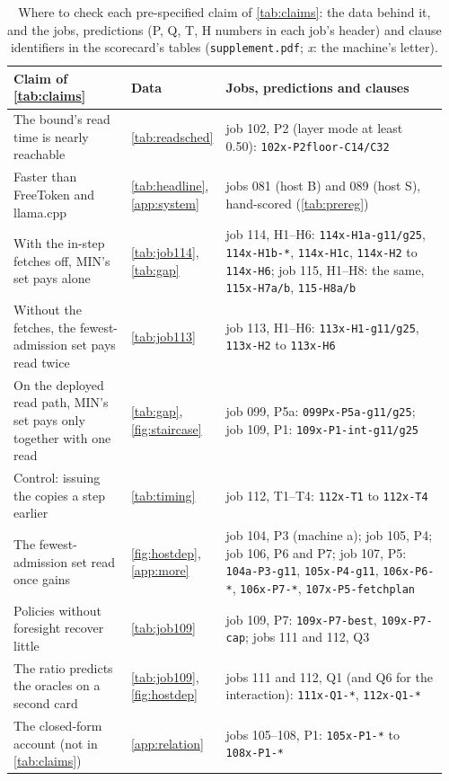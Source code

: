 \begin{table}[h]\centering\footnotesize
\caption{Where to check each pre-specified claim of \cref{tab:claims}: the data behind it, and the jobs, predictions
(P, Q, T, H numbers in each job's header) and clause identifiers in the scorecard's tables
(\texttt{supplement.pdf}; \emph{x}: the machine's letter).}\label{tab:claimindex}
\setlength\tabcolsep{3pt}
\begin{tabular}{@{}>{\raggedright\arraybackslash}p{0.27\linewidth}>{\raggedright\arraybackslash}p{0.18\linewidth}>{\raggedright\arraybackslash}p{0.51\linewidth}@{}}\toprule
Claim of \cref{tab:claims} & Data & Jobs, predictions and clauses \\\midrule
The bound's read time is nearly reachable & \cref{tab:readsched} & job 102, P2 (layer mode at least 0.50): \texttt{102x-P2floor-C14/C32} \\
Faster than FreeToken and llama.cpp & \cref{tab:headline}, \cref{app:system} & jobs 081 (host B) and 089 (host S), hand-scored (\cref{tab:prereg}) \\
With the in-step fetches off, MIN's set pays alone & \cref{tab:job114}, \cref{tab:gap} & job 114, H1--H6: \texttt{114x-H1a-g11/g25}, \texttt{114x-H1b-*}, \texttt{114x-H1c}, \texttt{114x-H2} to \texttt{114x-H6}; job 115, H1--H8: the same, \texttt{115x-H7a/b}, \texttt{115-H8a/b} \\
Without the fetches, the fewest-admission set pays read twice & \cref{tab:job113} & job 113, H1--H6: \texttt{113x-H1-g11/g25}, \texttt{113x-H2} to \texttt{113x-H6} \\
On the deployed read path, MIN's set pays only together with one read & \cref{tab:gap}, \cref{fig:staircase} & job 099, P5a: \texttt{099Px-P5a-g11/g25}; job 109, P1: \texttt{109x-P1-int-g11/g25} \\
Control: issuing the copies a step earlier & \cref{tab:timing} & job 112, T1--T4: \texttt{112x-T1} to \texttt{112x-T4} \\
The fewest-admission set read once gains & \cref{fig:hostdep}, \cref{app:more} & job 104, P3 (machine a); job 105, P4; job 106, P6 and P7; job 107, P5: \texttt{104a-P3-g11}, \texttt{105x-P4-g11}, \texttt{106x-P6-*}, \texttt{106x-P7-*}, \texttt{107x-P5-fetchplan} \\
Policies without foresight recover little & \cref{tab:job109} & job 109, P7: \texttt{109x-P7-best}, \texttt{109x-P7-cap}; jobs 111 and 112, Q3 \\
The ratio predicts the oracles on a second card & \cref{tab:job109}, \cref{fig:hostdep} & jobs 111 and 112, Q1 (and Q6 for the interaction): \texttt{111x-Q1-*}, \texttt{112x-Q1-*} \\
The closed-form account (not in \cref{tab:claims}) & \cref{app:relation} & jobs 105--108, P1: \texttt{105x-P1-*} to \texttt{108x-P1-*} \\
\bottomrule
\end{tabular}
\end{table}

